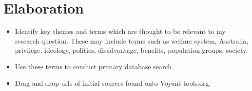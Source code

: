 \documentclass{article}
\begin{document}
\section{Elaboration}
\begin{itemize}
    \item Identify key themes and terms which are thought to be relevant to my research question. These may include terms such as welfare system, Australia, privilege, ideology, politics, disadvantage, benefits, population groups, society.
    \item Use these terms to conduct primary database search.
    \item Drag and drop urls of initial sources found onto Voyant-tools.org.
\end{itemize}
\end{document}
